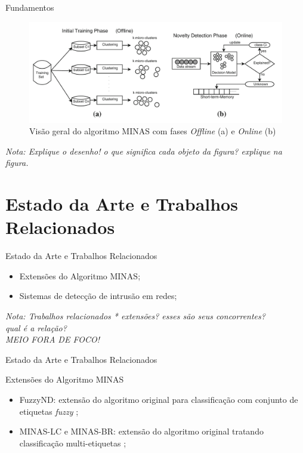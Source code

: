 \documentclass[aspectratio=43,10pt]{beamer}
\newcommand{\nota}[1]{\hspace*{-0.5cm}\textit{{\color[rgb]{1,0,0}Nota: #1}}}
\begin{document}
\begin{frame}[fragile]{Fundamentos}
\begin{figure}[ht]
\centering
\includegraphics[width=\textwidth]{figuras/FariaMinas2015-fases.png}
\caption{Visão geral do algoritmo MINAS com fases \emph{Offline} (a) e 
\emph{Online} (b) \cite{Faria2016minas}}
\label{fig:minas}
\end{figure}
\nota{Explique o desenho! o que significa cada objeto da figura? explique na figura.}
\end{frame}


\section{Estado da Arte e Trabalhos Relacionados}
\begin{frame}[fragile]{Estado da Arte e Trabalhos Relacionados}
\begin{itemize}
\item Extensões do Algoritmo MINAS;
\item Sistemas de detecção de intrusão em redes;
\end{itemize}
\nota{Trabalhos relacionados * extensões? esses são seus concorrentes?\\
qual é a relação?\\
MEIO FORA DE FOCO!}
\end{frame}

\begin{frame}[fragile]{Estado da Arte e Trabalhos Relacionados}
\begin{alertblock}{Extensões do Algoritmo MINAS}
  \begin{itemize}
    \item FuzzyND: extensão do algoritmo original para classificação com
    conjunto de etiquetas \emph{fuzzy} \cite{DaSilva2018,DaSilva2018thesis};
    \item MINAS-LC e MINAS-BR: extensão do algoritmo original tratando
    classificação multi-etiquetas \cite{Costa2019,Costa2019thesis};
  \end{itemize}
\end{alertblock}
\end{frame}
\end{document}
